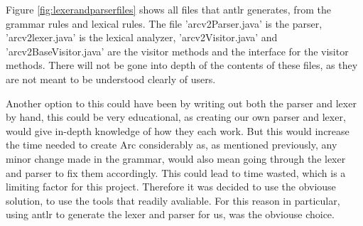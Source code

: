 Figure \ref{fig:lexerandparserfiles} shows all files that \gls{antlr} generates, from the grammar rules and lexical rules. The file 'arcv2Parser.java' is the parser, 'arcv2lexer.java' is the lexical analyzer, 'arcv2Visitor.java' and 'arcv2BaseVisitor.java' are the visitor methods and the interface for the visitor methods. There will not be gone into depth of the contents of these files, as they are not meant to be understood clearly of users. 





Another option to this could have been by writing out both the parser and lexer by hand, this could be very educational, as creating our own parser and lexer, would give in-depth knowledge of how they each work. But this would increase the time needed to create Arc considerably as, as mentioned previously, any minor change made in the grammar, would also mean going through the lexer and parser to fix them accordingly. This could lead to time wasted, which is a limiting factor for this project. Therefore it was decided to use the obviouse solution, to use the tools that readily avaliable. For this reason in particular, using \gls{antlr} to generate the lexer and parser for us, was the obviouse choice. 






